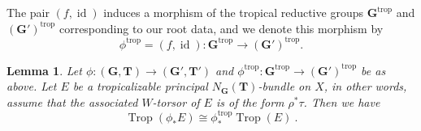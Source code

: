 \documentclass[10pt, a4paper]{amsart}
\newtheorem{lemma}[theorem]{Lemma}
\theoremstyle{definition}
\theoremstyle{myitemstyle}
\newcommand{\bfG}{\mathbf{G}}
\newcommand{\bfT}{\mathbf{T}}
\DeclareMathOperator{\Trop}{Trop}
\DeclareMathOperator{\id}{id}
\newcommand{\trop}{{\mathrm{trop}}}
\begin{document}
The pair $(f,\id)$ induces a morphism of the tropical reductive groups $\mathbf{G}^{\trop}$ and $(\mathbf{G}')^{\trop}$ corresponding to our root data, and we denote this morphism by
\[
    \phi^{\trop}=(f, \id) \colon \mathbf{G}^\trop\longrightarrow (\mathbf{G}')^\trop.
\]



\begin{lemma}
\label{lem:tropicalization commutes with central isogenies}
Let $\phi \colon(\mathbf{G},\mathbf{T})\to (\mathbf{G}',\mathbf{T}')$ and $\phi^{\trop}: \mathbf{G}^\trop \to (\mathbf{G}')^{\trop}$ be as above. Let $E$ be a tropicalizable principal $N_\bfG(\bfT)$-bundle on $X$, in other words, assume that the associated $W$-torsor of $E$ is of the form $\rho^*\tau$. Then we have
\[
    \Trop(\phi_*E)\cong \phi^\trop_*\Trop(E) \ .
\]
\end{lemma}
\end{document}
